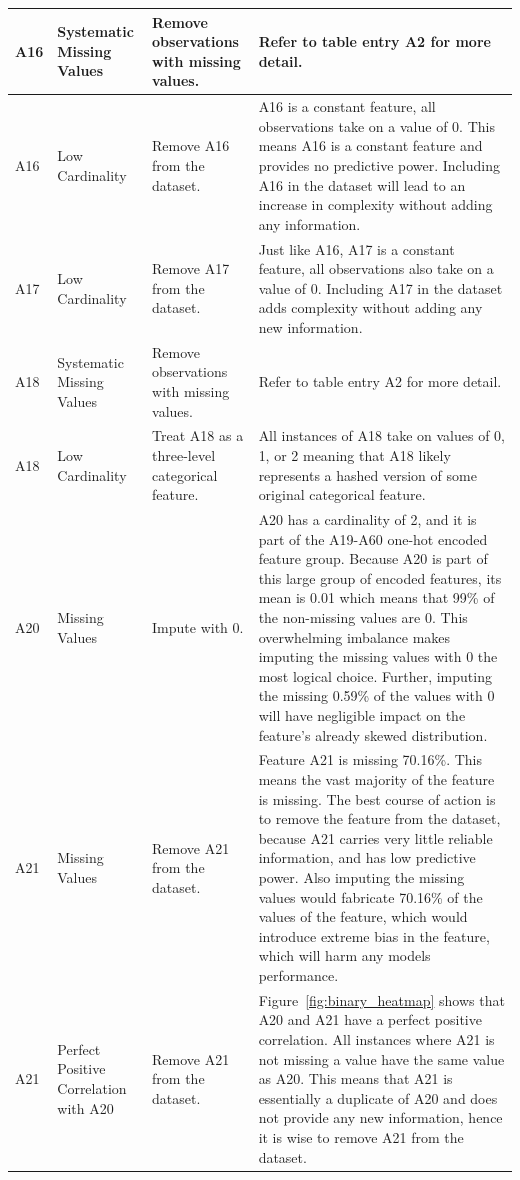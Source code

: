 \documentclass[11pt]{report}
\begin{document}
\begin{longtable}{p{2cm}p{3cm}p{4cm}p{6cm}}
\midrule
A16 & Systematic Missing Values & Remove observations with missing values. & Refer to table entry A2 for more detail. \\
\midrule
A16 & Low Cardinality & Remove A16 from the dataset. & A16 is a constant feature, all observations take on a value of 0. This means A16 is a constant feature and provides no predictive power. Including A16 in the dataset will lead to an increase in complexity without adding any information. \\
\midrule
A17 & Low Cardinality & Remove A17 from the dataset. & Just like A16, A17 is a constant feature, all observations also take on a value of 0. Including A17 in the dataset adds complexity without adding any new information. \\
\midrule
A18 & Systematic Missing Values & Remove observations with missing values. & Refer to table entry A2 for more detail. \\
\midrule
A18 & Low Cardinality & Treat A18 as a three-level categorical feature. & All instances of A18 take on values of 0, 1, or 2 meaning that A18 likely represents a hashed version of some original categorical feature. \\
\midrule
A20 & Missing Values & Impute with 0. & A20 has a cardinality of 2, and it is part of the A19-A60 one-hot encoded feature group. Because A20 is part of this large group of encoded features, its mean is 0.01 which means that 99\% of the non-missing values are 0. This overwhelming imbalance makes imputing the missing values with 0 the most logical choice. Further, imputing the missing 0.59\% of the values with 0 will have negligible impact on the feature's already skewed distribution. \\
\midrule
A21 & Missing Values & Remove A21 from the dataset. & Feature A21 is missing 70.16\%. This means the vast majority of the feature is missing. The best course of action is to remove the feature from the dataset, because A21 carries very little reliable information, and has low predictive power. Also imputing the missing values would fabricate 70.16\% of the values of the feature, which would introduce extreme bias in the feature, which will harm any models performance. \\
\midrule
A21 & Perfect Positive Correlation with A20 & Remove A21 from the dataset. & Figure~\ref{fig:binary_heatmap} shows that A20 and A21 have a perfect positive correlation. All instances where A21 is not missing a value have the same value as A20. This means that A21 is essentially a duplicate of A20 and does not provide any new information, hence it is wise to remove A21 from the dataset. \\

\end{longtable}
\end{document}
